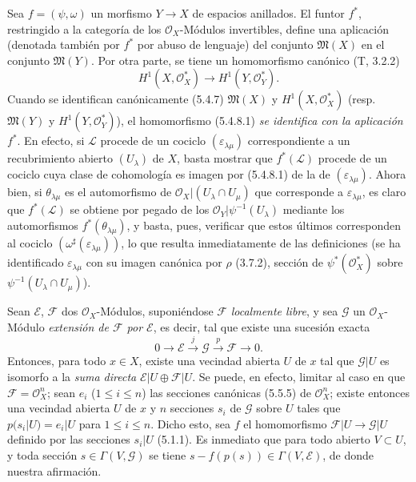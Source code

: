 \begin{env}[5.4.8]
\label{0.5.4.8-fr}
Sea $f=(\psi,\omega)$ un morfismo $Y\to X$ de espacios anillados. El funtor
$f^*$, restringido a la categoría de los $\mathcal{O}_X$-Módulos invertibles,
define una aplicación (denotada también por $f^*$ por abuso de lenguaje) del conjunto
$\mathfrak{M}(X)$ en el conjunto $\mathfrak{M}(Y)$. Por otra parte, se tiene un
homomorfismo canónico (T, 3.2.2)
\[
  H^1(X,\mathcal{O}_X^*)\longrightarrow H^1(Y,\mathcal{O}_Y^*).
  \tag{5.4.8.1}\label{0.5.4.8.1-fr}
\]
Cuando se identifican canónicamente (5.4.7) $\mathfrak{M}(X)$ y
$H^1(X,\mathcal{O}_X^*)$ (resp. $\mathfrak{M}(Y)$ y
$H^1(Y,\mathcal{O}_Y^*)$), el homomorfismo (5.4.8.1) \emph{se identifica con
la aplicación $f^*$}. En efecto, si $\mathcal{L}$ procede de un cociclo
$(\varepsilon_{\lambda\mu})$ correspondiente a un recubrimiento abierto
$(U_\lambda)$ de $X$, basta mostrar que $f^*(\mathcal{L})$ procede
de un cociclo cuya clase de cohomología es imagen por (5.4.8.1) de la de
$(\varepsilon_{\lambda\mu})$. Ahora bien, si $\theta_{\lambda\mu}$ es
el automorfismo de $\mathcal{O}_X|(U_\lambda\cap U_\mu)$ que corresponde a
$\varepsilon_{\lambda\mu}$, es claro que $f^*(\mathcal{L})$ se obtiene por
pegado de los $\mathcal{O}_Y|\psi^{-1}(U_\lambda)$ mediante los
automorfismos $f^*(\theta_{\lambda\mu})$, y basta, pues, verificar que
estos últimos corresponden al cociclo
$(\omega^\sharp(\varepsilon_{\lambda\mu}))$, lo que resulta inmediatamente de las
definiciones (se ha identificado $\varepsilon_{\lambda\mu}$ con su imagen canónica
por $\rho$ (3.7.2), sección de $\psi^*(\mathcal{O}_X^*)$ sobre
$\psi^{-1}(U_\lambda\cap U_\mu)$).
\end{env}

\begin{env}[5.4.9]
\label{0.5.4.9-fr}
Sean $\mathcal{E}$, $\mathcal{F}$ dos $\mathcal{O}_X$-Módulos,
suponiéndose $\mathcal{F}$ \emph{localmente libre}, y sea $\mathcal{G}$ un
$\mathcal{O}_X$-Módulo \emph{extensión de $\mathcal{F}$ por $\mathcal{E}$},
es decir, tal que existe una sucesión exacta
\[
  0\longrightarrow\mathcal{E}\xrightarrow{j}\mathcal{G}
  \xrightarrow{p}\mathcal{F}\longrightarrow 0.
\]
Entonces, para todo $x\in X$, existe una vecindad abierta $U$ de $x$ tal que
$\mathcal{G}|U$ es isomorfo a la \emph{suma directa}
$\mathcal{E}|U\oplus\mathcal{F}|U$. Se puede, en efecto, limitar al caso en que
$\mathcal{F}=\mathcal{O}_X^n$; sean $e_i$ ($1\leq i\leq n$) las secciones
canónicas (5.5.5) de $\mathcal{O}_X^n$; existe entonces una vecindad abierta
$U$ de $x$ y $n$ secciones $s_i$ de $\mathcal{G}$ sobre $U$ tales que
$p(s_i|U)=e_i|U$ para $1\leq i\leq n$. Dicho esto, sea $f$
el homomorfismo $\mathcal{F}|U\to\mathcal{G}|U$ definido por las secciones
$s_i|U$ (5.1.1). Es inmediato que para todo abierto $V\subset U$, y toda
sección $s\in\Gamma(V,\mathcal{G})$ se tiene
$s-f(p(s))\in\Gamma(V,\mathcal{E})$, de donde nuestra afirmación.
\end{env}

